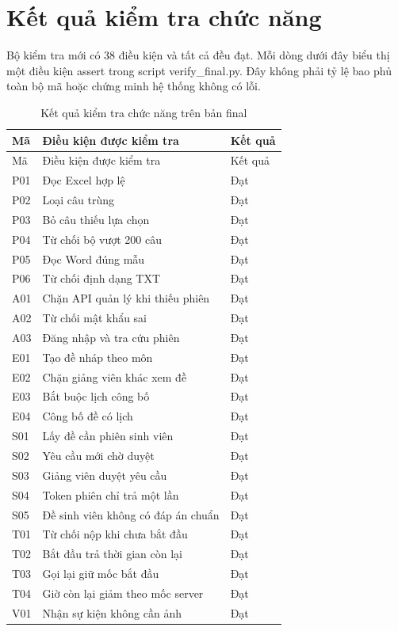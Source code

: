 \section{Kết quả kiểm tra chức năng}
Bộ kiểm tra mới có 38 điều kiện và tất cả đều đạt. Mỗi dòng dưới đây biểu thị một điều kiện assert trong script verify\_final.py. Đây không phải tỷ lệ bao phủ toàn bộ mã hoặc chứng minh hệ thống không có lỗi.
\begin{longtable}{@{}L{1.2cm}L{11.4cm}L{1.8cm}@{}}
\caption{Kết quả kiểm tra chức năng trên bản final}\\
\toprule Mã & Điều kiện được kiểm tra & Kết quả \\\midrule\endfirsthead
\toprule Mã & Điều kiện được kiểm tra & Kết quả \\\midrule\endhead
P01 & Đọc Excel hợp lệ & Đạt\\
P02 & Loại câu trùng & Đạt\\
P03 & Bỏ câu thiếu lựa chọn & Đạt\\
P04 & Từ chối bộ vượt 200 câu & Đạt\\
P05 & Đọc Word đúng mẫu & Đạt\\
P06 & Từ chối định dạng TXT & Đạt\\
A01 & Chặn API quản lý khi thiếu phiên & Đạt\\
A02 & Từ chối mật khẩu sai & Đạt\\
A03 & Đăng nhập và tra cứu phiên & Đạt\\
E01 & Tạo đề nháp theo môn & Đạt\\
E02 & Chặn giảng viên khác xem đề & Đạt\\
E03 & Bắt buộc lịch công bố & Đạt\\
E04 & Công bố đề có lịch & Đạt\\
S01 & Lấy đề cần phiên sinh viên & Đạt\\
S02 & Yêu cầu mới chờ duyệt & Đạt\\
S03 & Giảng viên duyệt yêu cầu & Đạt\\
S04 & Token phiên chỉ trả một lần & Đạt\\
S05 & Đề sinh viên không có đáp án chuẩn & Đạt\\
T01 & Từ chối nộp khi chưa bắt đầu & Đạt\\
T02 & Bắt đầu trả thời gian còn lại & Đạt\\
T03 & Gọi lại giữ mốc bắt đầu & Đạt\\
T04 & Giờ còn lại giảm theo mốc server & Đạt\\
V01 & Nhận sự kiện không cần ảnh & Đạt\\

\end{longtable}
